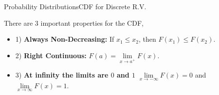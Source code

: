 \documentclass[8pt, usepdftitle=false]{beamer}
\begin{document}
\begin{frame}[allowframebreaks]{Probability Distributions}{CDF for Discrete R.V.}
\begin{itemize}
\medskip

There are $3$ important properties for the CDF, 

\medskip
\begin{itemize}
\item 1) \textbf{Always Non-Decreasing:} If $x_1 \leq x_2$, then $F\left(x_1\right) \leq F\left(x_2\right)$. 
\item 2) \textbf{Right Continuous:} $F(a)=\lim\limits_{x \rightarrow a^{+}} F(x)$.
\item 3) \textbf{At infinity the limits are $0$ and $1$} $\lim\limits_{x \rightarrow-\infty} F(x)=0$ and  $\lim\limits_{x \rightarrow \infty} F(x)=1$.
\end{itemize}














\end{itemize}

\end{frame}
\end{document}
